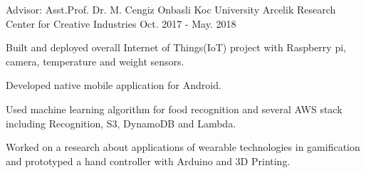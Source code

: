 \begin{cventries}
  \cvopenentry
    {Advisor: Asst.Prof. Dr. M. Cengiz Onbasli} %
    {Koc University Arcelik Research Center for Creative Industries} %
    {}
    {Oct. 2017 - May. 2018} %
    {
      \begin{cvitems} %
        \item {Built and deployed overall Internet of Things(IoT) project with Raspberry pi, camera, temperature and weight sensors.  }
        \item {Developed native mobile application for Android. }
       	\item {Used machine learning algorithm for food recognition and several AWS stack including Recognition, S3, DynamoDB and Lambda.} 
         \item {Worked on a research about applications  of wearable technologies in gamification and prototyped a hand controller with Arduino and 3D Printing.}
      \end{cvitems}
    }


\end{cventries}
